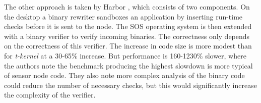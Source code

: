 The other approach is taken by Harbor \cite{Kumar:2007ge}, which consists of two components. On the desktop a binary rewriter sandboxes an application by inserting run-time checks before it is sent to the node. The SOS operating system \cite{Han:2005th} is then extended with a binary verifier to verify incoming binaries. The correctness only depends on the correctness of this verifier. The increase in code size is more modest than for \emph{t-kernel} at a 30-65\% increase. But performance is 160-1230\% slower, where the authors note the benchmark producing the highest slowdown is more typical of sensor node code. They also note more complex analysis of the binary code could reduce the number of necessary checks, but this would significantly increase the complexity of the verifier.

